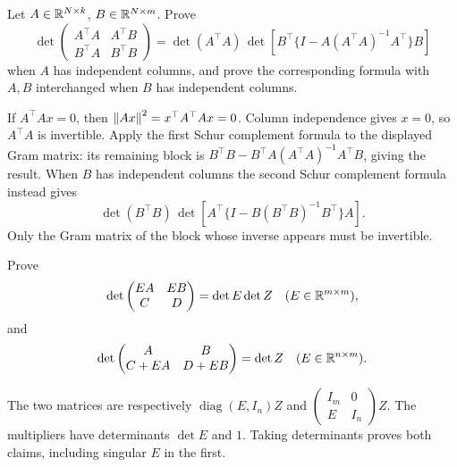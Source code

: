 \begin{problem}\label{ex:07:joint-gram}
Let \(A\in\mathbb R^{N\times k}\), \(B\in\mathbb R^{N\times m}\). Prove
\[
 \det\begin{pmatrix}A^\top A&A^\top B\\B^\top A&B^\top B\end{pmatrix}
 =\det(A^\top A)\,
 \det\!\left[B^\top\{I-A(A^\top A)^{-1}A^\top\}B\right]
\]
when \(A\) has independent columns, and prove the corresponding formula
with \(A,B\) interchanged when \(B\) has independent columns.
\end{problem}
\begin{solution}
If \(A^\top Ax=0\), then \(\left\lVert Ax\right\rVert^2=x^\top A^\top Ax=0\).
Column independence gives \(x=0\), so \(A^\top A\) is invertible.
Apply the first Schur complement formula to the displayed Gram matrix:
its remaining block is
\(B^\top B-B^\top A(A^\top A)^{-1}A^\top B\), giving the result.
When \(B\) has independent columns the second Schur complement formula
instead gives
\[
 \det(B^\top B)\,
 \det\!\left[A^\top\{I-B(B^\top B)^{-1}B^\top\}A\right].
\]
Only the Gram matrix of the block whose inverse appears must be invertible.
\end{solution}

\begin{problem}\label{ex:07:block-operations}
Prove
\[
 \det\begin{pmatrix}EA&EB\\C&D\end{pmatrix}=\det E\det Z
 \quad(E\in\mathbb R^{m\times m}),
\]
and
\[
 \det\begin{pmatrix}A&B\\C+EA&D+EB\end{pmatrix}=\det Z
 \quad(E\in\mathbb R^{n\times m}).
\]
\end{problem}
\begin{solution}
The two matrices are respectively
\(\operatorname{diag}(E,I_n)Z\) and
\(\begin{pmatrix}I_m&0\\E&I_n\end{pmatrix}Z\).
The multipliers have determinants \(\det E\) and \(1\).
Taking determinants proves both claims, including singular \(E\) in
the first.
\end{solution}

